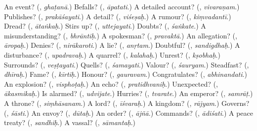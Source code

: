 \begin{tcolorbox}[breakable,colback=teal!4,colframe=teal!35!black,title={Before you move on}]
An event? (\textbf{}, \emph{ghaṭanā}.) Befalls? (\textbf{}, \emph{āpatati}.) A detailed account? (\textbf{}, \emph{vivaraṇam}.) Publishes? (\textbf{}, \emph{prakāśayati}.) A detail? (\textbf{}, \emph{viśeṣaḥ}.) A rumour? (\textbf{}, \emph{kiṃvadantī}.) Dread? (\textbf{}, \emph{ātaṅkaḥ}.) Stirs up? (\textbf{}, \emph{uttejayati}.) Doubts? (\textbf{}, \emph{śaṅkate}.) A misunderstanding? (\textbf{}, \emph{bhrāntiḥ}.) A spokesman? (\textbf{}, \emph{pravaktā}.) An allegation? (\textbf{}, \emph{āropaḥ}.) Denies? (\textbf{}, \emph{nirākaroti}.) A lie? (\textbf{}, \emph{anṛtam}.) Doubtful? (\textbf{}, \emph{sandigdhaḥ}.) A disturbance? (\textbf{}, \emph{upadravaḥ}.) A quarrel? (\textbf{}, \emph{kalahaḥ}.) Unrest? (\textbf{}, \emph{kṣobhaḥ}.) Surrounds? (\textbf{}, \emph{veṣṭayati}.) Quells? (\textbf{}, \emph{śamayati}.) Valour? (\textbf{}, \emph{śauryam}.) Steadfast? (\textbf{}, \emph{dhīraḥ}.) Fame? (\textbf{}, \emph{kīrtiḥ}.) Honour? (\textbf{}, \emph{gauravam}.) Congratulates? (\textbf{}, \emph{abhinandati}.) An explosion? (\textbf{}, \emph{visphoṭaḥ}.) An echo? (\textbf{}, \emph{pratidhvaniḥ}.) Unexpected? (\textbf{}, \emph{ākasmikaḥ}.) Is alarmed? (\textbf{}, \emph{udvijate}.) Hurries? (\textbf{}, \emph{tvarate}.) An emperor? (\textbf{}, \emph{samrāṭ}.) A throne? (\textbf{}, \emph{siṃhāsanam}.) A lord? (\textbf{}, \emph{īśvaraḥ}.) A kingdom? (\textbf{}, \emph{rājyam}.) Governs? (\textbf{}, \emph{śāsti}.) An envoy? (\textbf{}, \emph{dūtaḥ}.) An order? (\textbf{}, \emph{ājñā}.) Commands? (\textbf{}, \emph{ādiśati}.) A peace treaty? (\textbf{}, \emph{sandhiḥ}.) A vassal? (\textbf{}, \emph{sāmantaḥ}.)
\end{tcolorbox}
